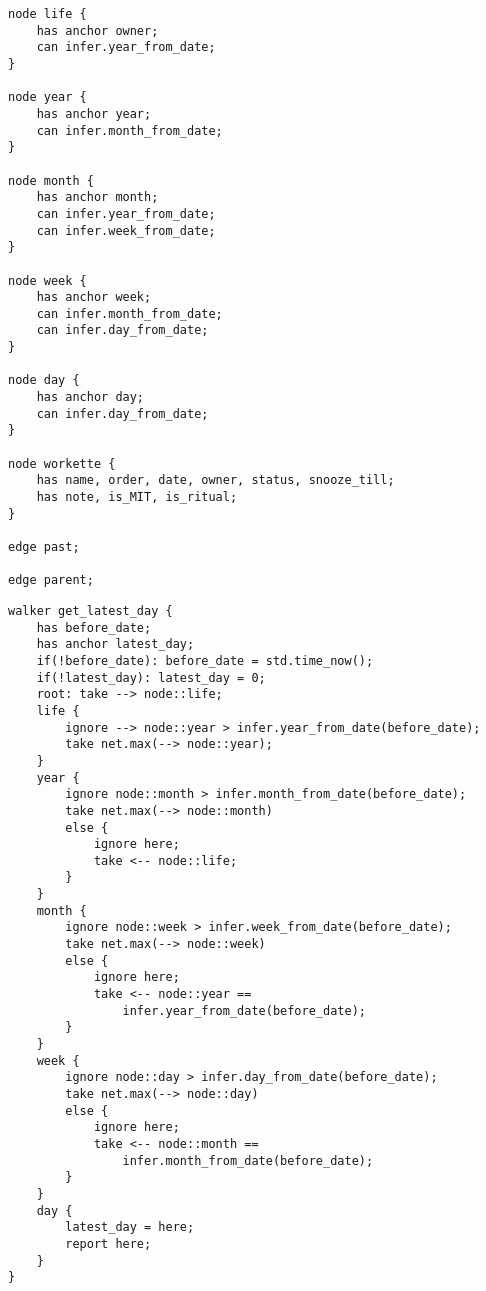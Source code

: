 
\begin{lstlisting}[caption={LifeLogify's Archetypes}]
node life {
    has anchor owner;
    can infer.year_from_date;
}

node year {
    has anchor year;
    can infer.month_from_date;
}

node month {
    has anchor month;
    can infer.year_from_date;
    can infer.week_from_date;
}

node week {
    has anchor week;
    can infer.month_from_date;
    can infer.day_from_date;
}

node day {
    has anchor day;
    can infer.day_from_date;
}

node workette {
    has name, order, date, owner, status, snooze_till;
    has note, is_MIT, is_ritual;
}

edge past;

edge parent;
\end{lstlisting}


\begin{lstlisting}[caption={Finding the most proximal day in graph}]
walker get_latest_day {
    has before_date;
    has anchor latest_day;
    if(!before_date): before_date = std.time_now();
    if(!latest_day): latest_day = 0;
    root: take --> node::life;
    life {
        ignore --> node::year > infer.year_from_date(before_date);
        take net.max(--> node::year);
    }
    year {
        ignore node::month > infer.month_from_date(before_date);
        take net.max(--> node::month)
        else {
            ignore here;
            take <-- node::life;
        }
    }
    month {
        ignore node::week > infer.week_from_date(before_date);
        take net.max(--> node::week)
        else {
            ignore here;
            take <-- node::year ==
                infer.year_from_date(before_date);
        }
    }
    week {
        ignore node::day > infer.day_from_date(before_date);
        take net.max(--> node::day)
        else {
            ignore here;
            take <-- node::month ==
                infer.month_from_date(before_date);
        }
    }
    day {
        latest_day = here;
        report here;
    }
}
\end{lstlisting}


